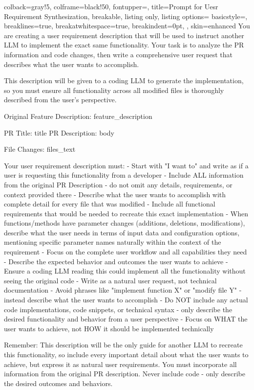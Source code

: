 \newpage
\begin{tcblisting}{
  colback=gray!5,
  colframe=black!50,
  fontupper=\ttfamily,
  title=Prompt for Uesr Requirement Synthesization,
  breakable,
  listing only,
  listing options={
    basicstyle=\ttfamily\small,
    breaklines=true,
    breakatwhitespace=true,
    breakindent=0pt,
  },
  skin=enhanced
}
You are creating a user requirement description that will be used to instruct another LLM to implement the exact same functionality. Your task is to analyze the PR information and code changes, then write a comprehensive user request that describes what the user wants to accomplish.

This description will be given to a coding LLM to generate the implementation, so you must ensure all functionality across all modified files is thoroughly described from the user's perspective.

Original Feature Description: {feature_description}

PR Title: {title}
PR Description: {body}

File Changes:
{files_text}

Your user requirement description must:
- Start with "I want to" and write as if a user is requesting this functionality from a developer
- Include ALL information from the original PR Description - do not omit any details, requirements, or context provided there
- Describe what the user wants to accomplish with complete detail for every file that was modified
- Include all functional requirements that would be needed to recreate this exact implementation
- When functions/methods have parameter changes (additions, deletions, modifications), describe what the user needs in terms of input data and configuration options, mentioning specific parameter names naturally within the context of the requirement
- Focus on the complete user workflow and all capabilities they need
- Describe the expected behavior and outcomes the user wants to achieve
- Ensure a coding LLM reading this could implement all the functionality without seeing the original code
- Write as a natural user request, not technical documentation
- Avoid phrases like "implement function X" or "modify file Y" - instead describe what the user wants to accomplish
- Do NOT include any actual code implementations, code snippets, or technical syntax - only describe the desired functionality and behavior from a user perspective
- Focus on WHAT the user wants to achieve, not HOW it should be implemented technically

Remember: This description will be the only guide for another LLM to recreate this functionality, so include every important detail about what the user wants to achieve, but express it as natural user requirements. You must incorporate all information from the original PR description. Never include code - only describe the desired outcomes and behaviors.
\end{tcblisting}

